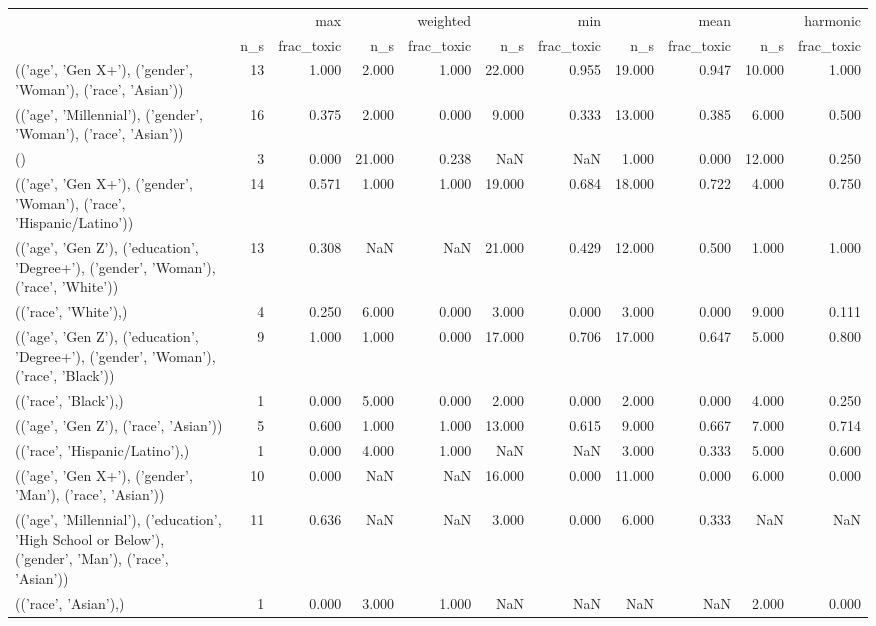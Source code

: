 \begin{tabular}{lrrrrrrrrrr}
\toprule
 & \multicolumn{2}{r}{max} & \multicolumn{2}{r}{weighted} & \multicolumn{2}{r}{min} & \multicolumn{2}{r}{mean} & \multicolumn{2}{r}{harmonic} \\
 & n_s & frac_toxic & n_s & frac_toxic & n_s & frac_toxic & n_s & frac_toxic & n_s & frac_toxic \\
\midrule
(('age', 'Gen X+'), ('gender', 'Woman'), ('race', 'Asian')) & 13 & 1.000 & 2.000 & 1.000 & 22.000 & 0.955 & 19.000 & 0.947 & 10.000 & 1.000 \\
(('age', 'Millennial'), ('gender', 'Woman'), ('race', 'Asian')) & 16 & 0.375 & 2.000 & 0.000 & 9.000 & 0.333 & 13.000 & 0.385 & 6.000 & 0.500 \\
() & 3 & 0.000 & 21.000 & 0.238 & NaN & NaN & 1.000 & 0.000 & 12.000 & 0.250 \\
(('age', 'Gen X+'), ('gender', 'Woman'), ('race', 'Hispanic/Latino')) & 14 & 0.571 & 1.000 & 1.000 & 19.000 & 0.684 & 18.000 & 0.722 & 4.000 & 0.750 \\
(('age', 'Gen Z'), ('education', 'Degree+'), ('gender', 'Woman'), ('race', 'White')) & 13 & 0.308 & NaN & NaN & 21.000 & 0.429 & 12.000 & 0.500 & 1.000 & 1.000 \\
(('race', 'White'),) & 4 & 0.250 & 6.000 & 0.000 & 3.000 & 0.000 & 3.000 & 0.000 & 9.000 & 0.111 \\
(('age', 'Gen Z'), ('education', 'Degree+'), ('gender', 'Woman'), ('race', 'Black')) & 9 & 1.000 & 1.000 & 0.000 & 17.000 & 0.706 & 17.000 & 0.647 & 5.000 & 0.800 \\
(('race', 'Black'),) & 1 & 0.000 & 5.000 & 0.000 & 2.000 & 0.000 & 2.000 & 0.000 & 4.000 & 0.250 \\
(('age', 'Gen Z'), ('race', 'Asian')) & 5 & 0.600 & 1.000 & 1.000 & 13.000 & 0.615 & 9.000 & 0.667 & 7.000 & 0.714 \\
(('race', 'Hispanic/Latino'),) & 1 & 0.000 & 4.000 & 1.000 & NaN & NaN & 3.000 & 0.333 & 5.000 & 0.600 \\
(('age', 'Gen X+'), ('gender', 'Man'), ('race', 'Asian')) & 10 & 0.000 & NaN & NaN & 16.000 & 0.000 & 11.000 & 0.000 & 6.000 & 0.000 \\
(('age', 'Millennial'), ('education', 'High School or Below'), ('gender', 'Man'), ('race', 'Asian')) & 11 & 0.636 & NaN & NaN & 3.000 & 0.000 & 6.000 & 0.333 & NaN & NaN \\
(('race', 'Asian'),) & 1 & 0.000 & 3.000 & 1.000 & NaN & NaN & NaN & NaN & 2.000 & 0.000 \\

\end{tabular}
